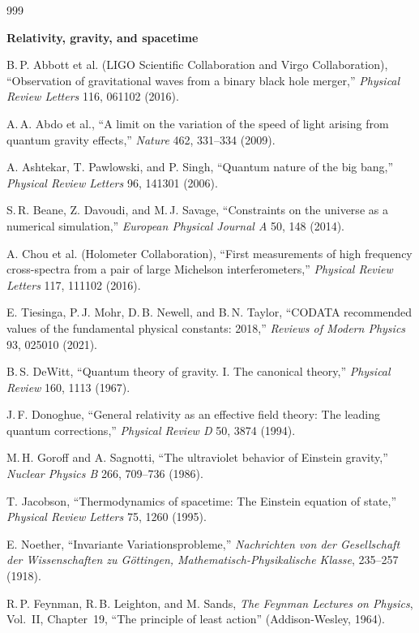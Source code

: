 \begin{thebibliography}{999}
\item[] \textbf{Relativity, gravity, and spacetime}

 B.\,P. Abbott et al. (LIGO Scientific Collaboration and Virgo Collaboration), ``Observation of gravitational waves from a binary black hole merger,'' \textit{Physical Review Letters} 116, 061102 (2016).

 A.\,A. Abdo et al., ``A limit on the variation of the speed of light arising from quantum gravity effects,'' \textit{Nature} 462, 331--334 (2009).

 A. Ashtekar, T. Pawlowski, and P. Singh, ``Quantum nature of the big bang,'' \textit{Physical Review Letters} 96, 141301 (2006).

 S.\,R. Beane, Z. Davoudi, and M.\,J. Savage, ``Constraints on the universe as a numerical simulation,'' \textit{European Physical Journal A} 50, 148 (2014).

 A. Chou et al. (Holometer Collaboration), ``First measurements of high frequency cross-spectra from a pair of large Michelson interferometers,'' \textit{Physical Review Letters} 117, 111102 (2016).

 E. Tiesinga, P.\,J. Mohr, D.\,B. Newell, and B.\,N. Taylor, ``CODATA recommended values of the fundamental physical constants: 2018,'' \textit{Reviews of Modern Physics} 93, 025010 (2021).

 B.\,S. DeWitt, ``Quantum theory of gravity. I. The canonical theory,'' \textit{Physical Review} 160, 1113 (1967).

 J.\,F. Donoghue, ``General relativity as an effective field theory: The leading quantum corrections,'' \textit{Physical Review D} 50, 3874 (1994).

 M.\,H. Goroff and A. Sagnotti, ``The ultraviolet behavior of Einstein gravity,'' \textit{Nuclear Physics B} 266, 709--736 (1986).

 T. Jacobson, ``Thermodynamics of spacetime: The Einstein equation of state,'' \textit{Physical Review Letters} 75, 1260 (1995).

 E. Noether, ``Invariante Variationsprobleme,'' \textit{Nachrichten von der Gesellschaft der Wissenschaften zu G\"ottingen, Mathematisch-Physikalische Klasse}, 235--257 (1918).

 R.\,P. Feynman, R.\,B. Leighton, and M. Sands, \textit{The Feynman Lectures on Physics}, Vol.~II, Chapter~19, ``The principle of least action'' (Addison-Wesley, 1964).


\end{thebibliography}
